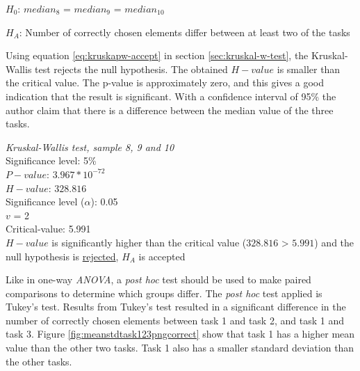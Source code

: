 \centerline{$H_{0}$: $median_8$ = $median_9$ = $median_{10}$}
\centerline{$H_{A}$: Number of correctly chosen elements differ between at least two of the tasks}
\vspace{0.2cm}

Using equation \ref{eq:kruskapw-accept} in section \ref{sec:kruskal-w-test}, the Kruskal-Wallis test rejects the null hypothesis. The obtained $H-value$ is smaller than the critical value. The p-value is approximately zero, and this gives a good indication that the result is significant. With a confidence interval of 95\% the author claim that there is a difference between the median value of the three tasks. \\[0.2cm]

 \begin{center}
	\begin{tcolorbox}[width=0.8\textwidth]
		\centering
		\textit{Kruskal-Wallis test, sample 8, 9 and 10}\\
		Significance level: 5\%  \\[0.5cm]
		
		$P-value$: $3.967* 10^{-72}$ \\
		$H-value$: $328.816$ \\
		Significance level ($\alpha$): 0.05 \\
		$v$ = 2\\ %
		Critical-value:  5.991\\[0.2cm] %
		
		$H-value$ is significantly higher than the critical value ($328.816$ > $5.991$) and the null hypothesis is \underline{rejected}, $H_A$ is accepted\\[0.5cm]
	\end{tcolorbox} 
\end{center}
\vspace{0.3cm}

Like in one-way \textit{ANOVA}, a \textit{post hoc} test should be used to make paired comparisons to determine which groups differ. The \textit{post hoc} test applied is Tukey's test. Results from Tukey's test resulted in a significant difference in the number of correctly chosen elements between task 1 and task 2, and task 1 and task 3. Figure \ref{fig:meanstdtask123pngcorrect} show that task 1 has a higher mean value than the other two tasks. Task 1 also has a smaller standard deviation than the other tasks. \\[0.2cm]

